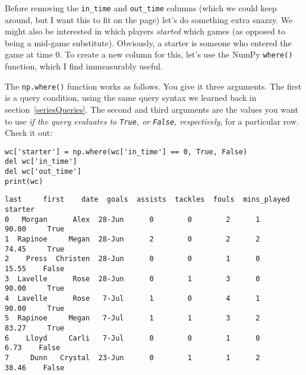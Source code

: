 

Before removing the \texttt{in\_time} and \texttt{out\_time} columns (which we
could keep around, but I want this to fit on the page) let's do something extra
snazzy. We might also be interested in which players \textit{started} which
games (as opposed to being a mid-game substitute). Obviously, a starter is
someone who entered the game at time 0. To create a new column for this, let's
use the NumPy \texttt{where()} function, which I find immeasurably useful.

The \texttt{np.where()} function works as follows. You give it three arguments.
The first is a query condition, using the same query syntax we learned back in
section~\ref{seriesQueries}. The second and third arguments are the values you
want to use \textit{if the query evaluates to \texttt{True}, or \texttt{False},
respectively}, for a particular row. Check it out:

\begin{samepage}
\begin{Verbatim}[fontsize=\small,samepage=true,frame=single,framesep=3mm]
wc['starter'] = np.where(wc['in_time'] == 0, True, False)
del wc['in_time']
del wc['out_time']
print(wc)
\end{Verbatim}
\vspace{-.2in}

\begin{Verbatim}[fontsize=\scriptsize,samepage=true,frame=leftline,framesep=5mm,framerule=1mm]
      last     first    date  goals  assists  tackles  fouls  mins_played  starter
0   Morgan      Alex  28-Jun      0        0        2      1        90.00     True
1  Rapinoe     Megan  28-Jun      2        0        2      2        74.45     True
2    Press  Christen  28-Jun      0        0        1      0        15.55    False
3  Lavelle      Rose  28-Jun      0        1        3      0        90.00     True
4  Lavelle      Rose   7-Jul      1        0        4      1        90.00     True
5  Rapinoe     Megan   7-Jul      1        1        3      2        83.27     True
6    Lloyd     Carli   7-Jul      0        0        1      0         6.73    False
7     Dunn   Crystal  23-Jun      0        1        1      2        38.46    False
\end{Verbatim}
\end{samepage}

